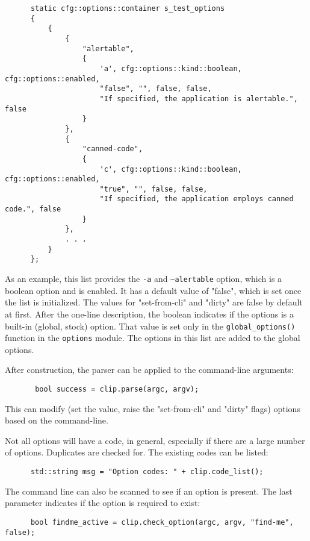    \begin{verbatim}
      static cfg::options::container s_test_options
      {
          {
              {
                  "alertable",
                  {
                      'a', cfg::options::kind::boolean, cfg::options::enabled,
                      "false", "", false, false,
                      "If specified, the application is alertable.", false
                  }
              },
              {
                  "canned-code",
                  {
                      'c', cfg::options::kind::boolean, cfg::options::enabled,
                      "true", "", false, false,
                      "If specified, the application employs canned code.", false
                  }
              },
              . . .
          }
      };
   \end{verbatim}

   As an example, this list provides the \texttt{-a} and \texttt{--alertable}
   option, which is a boolean option and is enabled. It has a default value
   of "false", which is set once the list is initialized.
   The values for "set-from-cli" and "dirty" are false by default at first.
   After the one-line description, the boolean indicates if the options
   is a built-in (global, stock) option. 
   That value is set only in the \texttt{global\_options()} function
   in the \texttt{options} module.
   The options in this list are added to the global options.

   After construction, the parser can be applied to the command-line
   arguments:

   \begin{verbatim}
       bool success = clip.parse(argc, argv);
   \end{verbatim}

   This can modify (set the value, raise the "set-from-cli" and "dirty"
   flags) options based on the command-line.

   Not all options will have a code, in general, especially if there are a
   large number of options. Duplicates are checked for.
   The existing codes can be listed:

   \begin{verbatim}
      std::string msg = "Option codes: " + clip.code_list();
   \end{verbatim}

   The command line can also be scanned to see if an option is present.
   The last parameter indicates if the option is required to exist:

   \begin{verbatim}
      bool findme_active = clip.check_option(argc, argv, "find-me", false);
   \end{verbatim}

